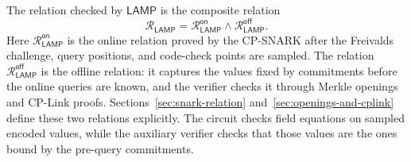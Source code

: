 \documentclass[conference,compsoc]{IEEEtran}
\newcommand{\protocol}{\textsf{LAMP}}   %
\theoremstyle{plain}
\theoremstyle{definition}
\theoremstyle{remark}
\begin{document}
The relation checked by \(\protocol\) is the composite relation
\[
  \mathcal{R}_{\mathsf{LAMP}}
  =
  \mathcal{R}_{\mathsf{LAMP}}^{\mathsf{on}}
  \land
  \mathcal{R}_{\mathsf{LAMP}}^{\mathsf{off}} .
\]
Here \(\mathcal{R}_{\mathsf{LAMP}}^{\mathsf{on}}\) is the online relation proved by the CP-SNARK after the Freivalds challenge, query positions, and code-check points are sampled.  The relation \(\mathcal{R}_{\mathsf{LAMP}}^{\mathsf{off}}\) is the offline relation: it captures the values fixed by commitments before the online queries are known, and the verifier checks it through Merkle openings and CP-Link proofs.
Sections~\ref{sec:snark-relation} and~\ref{sec:openings-and-cplink} define
these two relations explicitly.
The circuit checks field equations on sampled encoded values, while the auxiliary verifier checks that those values are the ones bound by the pre-query commitments.
\end{document}
